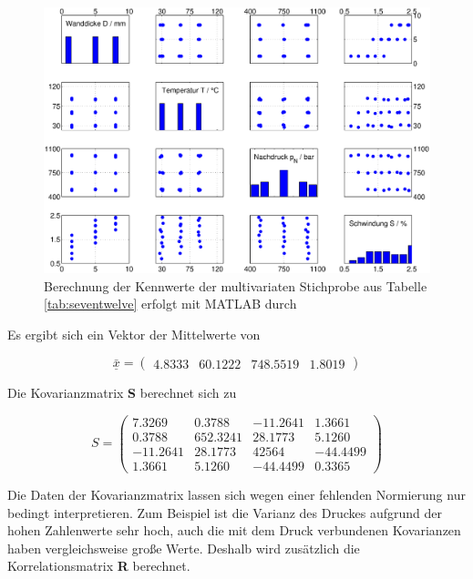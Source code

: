 \noindent 
\begin{figure}[H]
  \centerline{\includegraphics[width=1\textwidth]{Kapitel7/Bilder/image12}}
  \caption{Berechnung der Kennwerte der multivariaten Stichprobe aus Tabelle \ref{tab:seventwelve} erfolgt mit MATLAB durch}
  \label{fig:Spritzgussprozess2}
\end{figure}



\noindent Es ergibt sich ein Vektor der Mittelwerte von

\begin{equation}\label{eq:seventwentyeight}
\underline{\bar{x}}=\left(\begin{array}{cccc} {4.8333} & {60.1222} & {748.5519} & {1.8019} \end{array}\right)
\end{equation}

\noindent Die Kovarianzmatrix \textbf{S} berechnet sich zu

\begin{equation}\label{eq:seventwentynine}
S=\left(\begin{array}{cccc} {7.3269} & {0.3788} & {-11.2641} & {1.3661} \\ 
{0.3788} & {652.3241} & {28.1773} & {5.1260} \\
{-11.2641} & {28.1773} & {42564} & {-44.4499} \\ 
{1.3661} & {5.1260} & {-44.4499} & {0.3365} \end{array}\right)
\end{equation}

\noindent Die Daten der Kovarianzmatrix lassen sich wegen einer fehlenden Normierung nur bedingt interpretieren. Zum Beispiel ist die Varianz des Druckes aufgrund der hohen Zahlenwerte sehr hoch, auch die mit dem Druck verbundenen Kovarianzen haben vergleichsweise gro{\ss}e Werte. Deshalb wird zus\"{a}tzlich die Korrelationsmatrix \textbf{R} berechnet.

